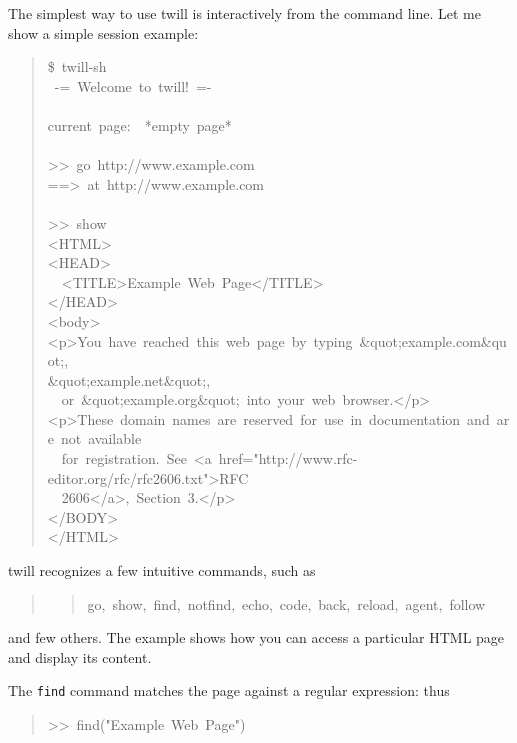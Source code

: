 \documentclass[10pt,a4paper,english]{article}
\begin{document}
The simplest way to use twill is interactively from the command line.
Let me show a simple session example:
\begin{quote}{\ttfamily \raggedright \noindent
{\$}~twill-sh~\\
~-=~Welcome~to~twill!~=-~\\
~\\
current~page:~~*empty~page*~\\
~~~~~~~~~~~~~~~~~~\\
>{}>~go~http://www.example.com~\\
==>~at~http://www.example.com~\\
~\\
>{}>~show~\\
<HTML>~\\
<HEAD>~\\
~~<TITLE>Example~Web~Page</TITLE>~\\
</HEAD>~\\
<body>~\\
<p>You~have~reached~this~web~page~by~typing~{\&}quot;example.com{\&}quot;,~\\
{\&}quot;example.net{\&}quot;,~\\
~~or~{\&}quot;example.org{\&}quot;~into~your~web~browser.</p>~\\
<p>These~domain~names~are~reserved~for~use~in~documentation~and~are~not~available~\\
~~for~registration.~See~<a~href="http://www.rfc-editor.org/rfc/rfc2606.txt">RFC~\\
~~2606</a>,~Section~3.</p>~\\
</BODY>~\\
</HTML>
}\end{quote}

twill recognizes a few intuitive commands, such as
\begin{quote}
\begin{quote}{\ttfamily \raggedright \noindent
go,~show,~find,~notfind,~echo,~code,~back,~reload,~agent,~follow
}\end{quote}
\end{quote}

and few others. The example shows how you can access
a particular HTML page and display its content.

The \texttt{find} command matches the page against a regular
expression: thus
\begin{quote}{\ttfamily \raggedright \noindent
>{}>~find("Example~Web~Page")
}\end{quote}
\end{document}
